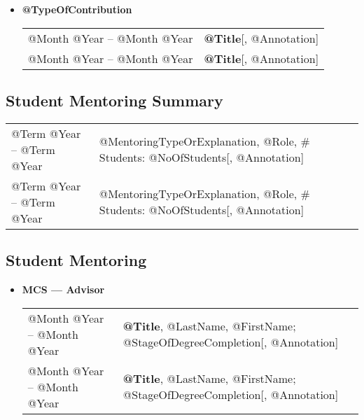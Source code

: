 \documentclass[10pt]{article}
\begin{document}
\begin{IOWA ONLY}
\begin{itemize}
\item[] \textbf{@TypeOfContribution}
\\[1.3ex]
\begin{tabular}{l@{\quad\ }p{35em}} 
 @Month @Year -- @Month @Year
 & {\bf @Title}[, @Annotation]
 \\[.5ex]
 @Month @Year -- @Month @Year
 & {\bf @Title}[, @Annotation]
 \\[.5ex]
\end{tabular}
\end{itemize}


\subsection*{Student Mentoring Summary}
\smallskip


\begin{tabular}{l@{\quad\ }p{35em}} 
 @Term @Year -- @Term @Year
 & @MentoringTypeOrExplanation, @Role, \# Students: @NoOfStudents[, @Annotation]
 \\[.5ex]
 @Term @Year -- @Term @Year
 & @MentoringTypeOrExplanation, @Role, \# Students: @NoOfStudents[, @Annotation]
 \\[.5ex]
\end{tabular}

\subsection*{Student Mentoring}
\smallskip

\begin{itemize}
\item[] \textbf{MCS --- Advisor}
\\[1.3ex]
\begin{tabular}{l@{\quad\ }p{30em}} 
 @Month @Year -- @Month @Year
 & {\bf @Title}, @LastName, @FirstName; @StageOfDegreeCompletion[, @Annotation]
 \\[.5ex]
 @Month @Year -- @Month @Year
 & {\bf @Title}, @LastName, @FirstName; @StageOfDegreeCompletion[, @Annotation]
 \\[.5ex]
\end{tabular}


\end{itemize}
\end{IOWA ONLY}
\end{document}
